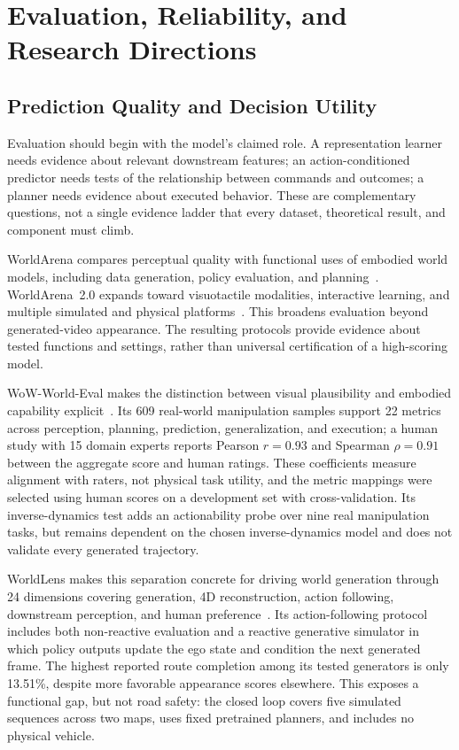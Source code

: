 \section{Evaluation, Reliability, and Research Directions}
\label{sec:evaluation}

\subsection{Prediction Quality and Decision Utility}
Evaluation should begin with the model's claimed role. A representation learner needs evidence about relevant downstream features; an action-conditioned predictor needs tests of the relationship between commands and outcomes; a planner needs evidence about executed behavior. These are complementary questions, not a single evidence ladder that every dataset, theoretical result, and component must climb.

WorldArena compares perceptual quality with functional uses of embodied world models, including data generation, policy evaluation, and planning~\cite{shang2026worldarena}. WorldArena~2.0 expands toward visuotactile modalities, interactive learning, and multiple simulated and physical platforms~\cite{shang2026worldarena2}. This broadens evaluation beyond generated-video appearance. The resulting protocols provide evidence about tested functions and settings, rather than universal certification of a high-scoring model.

WoW-World-Eval makes the distinction between visual plausibility and embodied capability explicit~\cite{fan2026wowworldeval}. Its 609 real-world manipulation samples support 22 metrics across perception, planning, prediction, generalization, and execution; a human study with 15 domain experts reports Pearson $r=0.93$ and Spearman $\rho=0.91$ between the aggregate score and human ratings. These coefficients measure alignment with raters, not physical task utility, and the metric mappings were selected using human scores on a development set with cross-validation. Its inverse-dynamics test adds an actionability probe over nine real manipulation tasks, but remains dependent on the chosen inverse-dynamics model and does not validate every generated trajectory.

WorldLens makes this separation concrete for driving world generation through 24 dimensions covering generation, 4D reconstruction, action following, downstream perception, and human preference~\cite{liang2026worldlens}. Its action-following protocol includes both non-reactive evaluation and a reactive generative simulator in which policy outputs update the ego state and condition the next generated frame. The highest reported route completion among its tested generators is only 13.51\%, despite more favorable appearance scores elsewhere. This exposes a functional gap, but not road safety: the closed loop covers five simulated sequences across two maps, uses fixed pretrained planners, and includes no physical vehicle.

